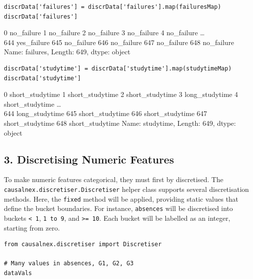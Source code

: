 \documentclass[
]{article}
\begin{document}
\begin{verbatim}
discrData['failures'] = discrData['failures'].map(failuresMap)
discrData['failures']
\end{verbatim}

0 no\_failure 1 no\_failure 2 no\_failure 3 no\_failure 4 no\_failure
\ldots{}\\
644 yes\_failure 645 no\_failure 646 no\_failure 647 no\_failure 648
no\_failure Name: failures, Length: 649, dtype: object

\begin{verbatim}
discrData['studytime'] = discrData['studytime'].map(studytimeMap)
discrData['studytime']
\end{verbatim}

0 short\_studytime 1 short\_studytime 2 short\_studytime 3
long\_studytime 4 short\_studytime \ldots{}\\
644 long\_studytime 645 short\_studytime 646 short\_studytime 647
short\_studytime 648 short\_studytime Name: studytime, Length: 649,
dtype: object

\hypertarget{discretising-numeric-features}{%
\subsection{3. Discretising Numeric
Features}\label{discretising-numeric-features}}

To make numeric features categorical, they must first by discretised.
The \texttt{causalnex.discretiser.Discretiser} helper
class supports several discretisation methods. Here, the
\texttt{fixed} method will be applied, providing static
values that define the bucket boundaries. For instance,
\texttt{absences} will be discretised into buckets
\texttt{< 1}, \texttt{1 to 9}, and
\texttt{>= 10}. Each bucket will be labelled as an
integer, starting from zero.

\begin{verbatim}
from causalnex.discretiser import Discretiser

# Many values in absences, G1, G2, G3
dataVals
\end{verbatim}
\end{document}
